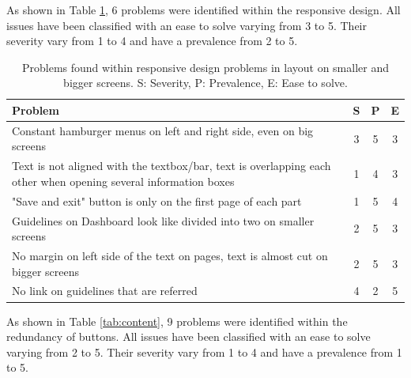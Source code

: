\documentclass{sigchi}
\begin{document}
As shown in Table \ref{tab:responsiveDesign}, 6 problems were identified within the responsive design. All issues have been classified with an ease to solve varying from 3 to 5. Their severity vary from 1 to 4 and have a prevalence from 2 to 5.

\begin{table}[H]
    \centering
    \begin{tabular}{|m{6.5cm}|c|c|c|}
    \hline
        \textbf{Problem} & \textbf{S} & \textbf{P} & \textbf{E}\\
    \hline
         Constant hamburger menus on left and right side, even on big screens  & 3 & 5 & 3\\
    \hline
         Text is not aligned with the textbox/bar, text is overlapping each other when opening several information boxes & 1 & 4 & 3\\
    \hline
         "Save and exit" button is only on the first page of each part & 1 & 5 & 4\\
    \hline
         Guidelines on Dashboard look like divided into two on smaller screens & 2 & 5 & 3\\
    \hline
         No margin on left side of the text on pages, text is almost cut on bigger screens & 2 & 5 & 3\\
    \hline
         No link on guidelines that are referred & 4 & 2 & 5\\
    \hline
    \end{tabular}
    \caption{Problems found within responsive design problems in layout on smaller and bigger screens. S: Severity, P: Prevalence, E: Ease to solve.}
    \label{tab:responsiveDesign}
\end{table}

As shown in Table \ref{tab:content}, 9 problems were identified within the redundancy of buttons. All issues have been classified with an ease to solve varying from 2 to 5. Their severity vary from 1 to 4 and have a prevalence from 1 to 5.
\end{document}
